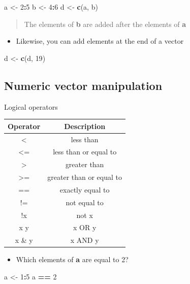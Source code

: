 \documentclass[]{book}
\newenvironment{Shaded}{\begin{snugshade}}{\end{snugshade}}
\newcommand{\DecValTok}[1]{\textcolor[rgb]{0.00,0.00,0.81}{#1}}
\newcommand{\KeywordTok}[1]{\textcolor[rgb]{0.13,0.29,0.53}{\textbf{#1}}}
\newcommand{\NormalTok}[1]{#1}
\newcommand{\OperatorTok}[1]{\textcolor[rgb]{0.81,0.36,0.00}{\textbf{#1}}}
\newcommand{\StringTok}[1]{\textcolor[rgb]{0.31,0.60,0.02}{#1}}
\providecommand{\tightlist}{%
  \setlength{\itemsep}{0pt}\setlength{\parskip}{0pt}}
\begin{document}
\begin{Shaded}
\begin{Highlighting}[]
\NormalTok{a <-}\StringTok{ }\DecValTok{2}\OperatorTok{:}\DecValTok{5}
\NormalTok{b <-}\StringTok{ }\DecValTok{4}\OperatorTok{:}\DecValTok{6}
\NormalTok{d <-}\StringTok{ }\KeywordTok{c}\NormalTok{(a, b)}
\end{Highlighting}
\end{Shaded}

\begin{quote}
The elements of \textbf{b} are added after the elements of \textbf{a}
\end{quote}

\begin{itemize}
\tightlist
\item
  Likewise, you can add elements at the end of a vector
\end{itemize}

\begin{Shaded}
\begin{Highlighting}[]
\NormalTok{d <-}\StringTok{ }\KeywordTok{c}\NormalTok{(d, }\DecValTok{19}\NormalTok{)}
\end{Highlighting}
\end{Shaded}

\hypertarget{numeric-vector-manipulation}{%
\subsection{Numeric vector manipulation}\label{numeric-vector-manipulation}}

Logical operators

\begin{longtable}[]{@{}cc@{}}
\toprule
Operator & Description\tabularnewline
\midrule
\endhead
\textless{} & less than\tabularnewline
\textless{}= & less than or equal to\tabularnewline
\textgreater{} & greater than\tabularnewline
\textgreater{}= & greater than or equal to\tabularnewline
== & exactly equal to\tabularnewline
!= & not equal to\tabularnewline
!x & not x\tabularnewline
x \textbar{} y & x OR y\tabularnewline
x \& y & x AND y\tabularnewline
\bottomrule
\end{longtable}

\begin{itemize}
\tightlist
\item
  Which elements of \textbf{a} are equal to 2?
\end{itemize}

\begin{Shaded}
\begin{Highlighting}[]
\NormalTok{a <-}\StringTok{ }\DecValTok{1}\OperatorTok{:}\DecValTok{5}
\NormalTok{a }\OperatorTok{==}\StringTok{ }\DecValTok{2}
\end{Highlighting}
\end{Shaded}
\end{document}
